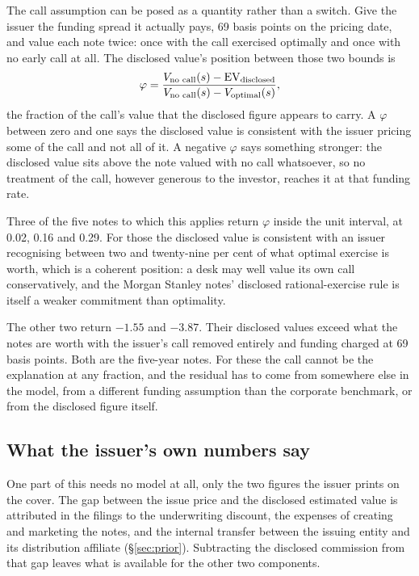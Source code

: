 The call assumption can be posed as a quantity rather than a switch. Give the
issuer the funding spread it actually pays, 69 basis points on the pricing
date, and value each note twice: once with the call exercised optimally and
once with no early call at all. The disclosed value's position between those
two bounds is
%
\begin{equation}
  \varphi = \frac{V_{\text{no call}}(s) - \mathrm{EV}_{\text{disclosed}}}
                 {V_{\text{no call}}(s) - V_{\text{optimal}}(s)},
  \label{eq:phi}
\end{equation}
%
the fraction of the call's value that the disclosed figure appears to carry. A
$\varphi$ between zero and one says the disclosed value is consistent with the
issuer pricing some of the call and not all of it. A negative $\varphi$ says
something stronger: the disclosed value sits above the note valued with no call
whatsoever, so no treatment of the call, however generous to the investor,
reaches it at that funding rate.

Three of the five notes to which this applies return $\varphi$ inside the unit
interval, at 0.02, 0.16 and 0.29. For those the disclosed value is consistent
with an issuer recognising between two and twenty-nine per cent of what
optimal exercise is worth, which is a coherent position: a desk may well value
its own call conservatively, and the Morgan Stanley notes' disclosed
rational-exercise rule is itself a weaker commitment than optimality.

The other two return $-1.55$ and $-3.87$. Their disclosed values exceed what
the notes are worth with the issuer's call removed entirely and funding charged
at 69 basis points. Both are the five-year notes. For these the call cannot be
the explanation at any fraction, and the residual has to come from somewhere
else in the model, from a different funding assumption than the corporate
benchmark, or from the disclosed figure itself.

\subsection{What the issuer's own numbers say}

One part of this needs no model at all, only the two figures the issuer prints
on the cover. The gap between the issue price and the disclosed estimated
value is attributed in the filings to the underwriting discount, the expenses
of creating and marketing the notes, and the internal transfer between the
issuing entity and its distribution affiliate (\S\ref{sec:prior}). Subtracting
the disclosed commission from that gap leaves what is available for the other
two components.

